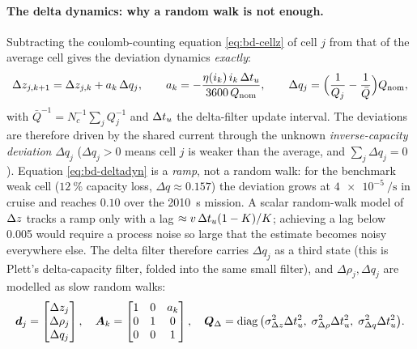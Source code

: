 \paragraph{The delta dynamics: why a random walk is not enough.} Subtracting the coulomb-counting
equation \eqref{eq:bd-cellz} of cell $j$ from that of the average cell gives the deviation
dynamics \emph{exactly}:
\begin{equation}
\Delta z_{j,k+1} = \Delta z_{j,k} + a_k\,\Delta q_j ,\qquad
a_k = -\frac{\eta(i_k)\,i_k\,\Delta t_u}{3600\,Q_{\text{nom}}},\qquad
\Delta q_j = \Big(\frac{1}{Q_j} - \frac{1}{\bar Q}\Big)Q_{\text{nom}},
\label{eq:bd-deltadyn}
\end{equation}
with $\bar Q^{-1} = N_c^{-1}\sum_j Q_j^{-1}$ and $\Delta t_u$ the delta-filter update interval. The
deviations are therefore driven by the shared current through the unknown \emph{inverse-capacity
deviation} $\Delta q_j$ ($\Delta q_j > 0$ means cell $j$ is weaker than the average, and
$\sum_j\Delta q_j = 0$). Equation \eqref{eq:bd-deltadyn} is a \emph{ramp}, not a random walk: for
the benchmark weak cell ($\SI{12}{\percent}$ capacity loss, $\Delta q \approx 0.157$) the
deviation grows at $\SI{4e-5}{\per\second}$ in cruise and reaches $\num{0.10}$ over the
\SI{2010}{\second} mission. A scalar random-walk model of $\Delta z$ tracks a ramp only with a
lag $\approx v\,\Delta t_u(1-K)/K$; achieving a lag below \num{0.005} would require a process noise so
large that the estimate becomes noisy everywhere else. The delta filter therefore carries
$\Delta q_j$ as a third state (this is Plett's delta-capacity filter, folded into the same small
filter), and $\Delta\rho_j,\Delta q_j$ are modelled as slow random walks:
\begin{equation}
\bm{d}_j = \begin{bmatrix}\Delta z_j\\ \Delta\rho_j\\ \Delta q_j\end{bmatrix},\quad
\bm{A}_k = \begin{bmatrix}1&0&a_k\\0&1&0\\0&0&1\end{bmatrix},\quad
\bm{Q}_\Delta = \operatorname{diag}\big(\sigma_{\Delta z}^2\Delta t_u^2,\;\sigma_{\Delta\rho}^2\Delta t_u^2,\;\sigma_{\Delta q}^2\Delta t_u^2\big).
\label{eq:bd-deltamodel}
\end{equation}

